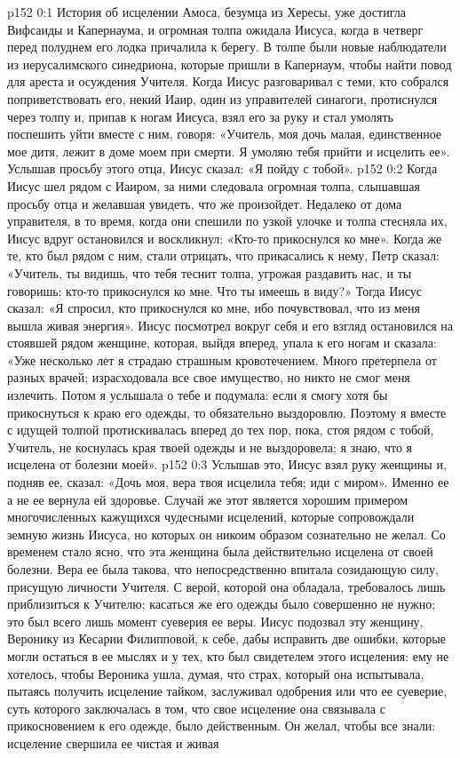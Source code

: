 \vs p152 0:1 История об исцелении Амоса, безумца из Хересы, уже достигла Вифсаиды и Капернаума, и огромная толпа ожидала Иисуса, когда в четверг перед полуднем его лодка причалила к берегу. В толпе были новые наблюдатели из иерусалимского синедриона, которые пришли в Капернаум, чтобы найти повод для ареста и осуждения Учителя. Когда Иисус разговаривал с теми, кто собрался поприветствовать его, некий Иаир, один из управителей синагоги, протиснулся через толпу и, припав к ногам Иисуса, взял его за руку и стал умолять поспешить уйти вместе с ним, говоря: «Учитель, моя дочь малая, единственное мое дитя, лежит в доме моем при смерти. Я умоляю тебя прийти и исцелить ее». Услышав просьбу этого отца, Иисус сказал: «Я пойду с тобой».
\vs p152 0:2 Когда Иисус шел рядом с Иаиром, за ними следовала огромная толпа, слышавшая просьбу отца и желавшая увидеть, что же произойдет. Недалеко от дома управителя, в то время, когда они спешили по узкой улочке и толпа стесняла их, Иисус вдруг остановился и воскликнул: «Кто\hyp{}то прикоснулся ко мне». Когда же те, кто был рядом с ним, стали отрицать, что прикасались к нему, Петр сказал: «Учитель, ты видишь, что тебя теснит толпа, угрожая раздавить нас, и ты говоришь: кто\hyp{}то прикоснулся ко мне. Что ты имеешь в виду?» Тогда Иисус сказал: «Я спросил, кто прикоснулся ко мне, ибо почувствовал, что из меня вышла живая энергия». Иисус посмотрел вокруг себя и его взгляд остановился на стоявшей рядом женщине, которая, выйдя вперед, упала к его ногам и сказала: «Уже несколько лет я страдаю страшным кровотечением. Много претерпела от разных врачей; израсходовала все свое имущество, но никто не смог меня излечить. Потом я услышала о тебе и подумала: если я смогу хотя бы прикоснуться к краю его одежды, то обязательно выздоровлю. Поэтому я вместе с идущей толпой протискивалась вперед до тех пор, пока, стоя рядом с тобой, Учитель, не коснулась края твоей одежды и не выздоровела; я знаю, что я исцелена от болезни моей».
\vs p152 0:3 Услышав это, Иисус взял руку женщины и, подняв ее, сказал: «Дочь моя, вера твоя исцелила тебя; иди с миром». Именно ее  а не ее  вернула ей здоровье. Случай же этот является хорошим примером многочисленных кажущихся чудесными исцелений, которые сопровождали земную жизнь Иисуса, но которых он никоим образом сознательно не желал. Со временем стало ясно, что эта женщина была действительно исцелена от своей болезни. Вера ее была такова, что непосредственно впитала созидающую силу, присущую личности Учителя. С верой, которой она обладала, требовалось лишь приблизиться к Учителю; касаться же его одежды было совершенно не нужно; это был всего лишь момент суеверия ее веры. Иисус подозвал эту женщину, Веронику из Кесарии Филипповой, к себе, дабы исправить две ошибки, которые могли остаться в ее мыслях и у тех, кто был свидетелем этого исцеления: ему не хотелось, чтобы Вероника ушла, думая, что страх, который она испытывала, пытаясь получить исцеление тайком, заслуживал одобрения или что ее суеверие, суть которого заключалась в том, что свое исцеление она связывала с прикосновением к его одежде, было действенным. Он желал, чтобы все знали: исцеление свершила ее чистая и живая 
